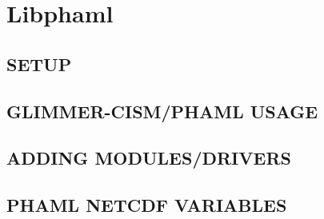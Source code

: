 

\newenvironment{framecode}[1]%
{
 \vspace{.5cm} 
 \begin{center}
 \begin{Sbox}
 \begin{minipage}{#1}

}
{
 \end{minipage}
 \end{Sbox}
 \fbox{\TheSbox}
 \end{center}
 }



\newcommand{\appdir}{}

\newenvironment{dispcode}[3]%
{
\section{#1}\label{#3}
\begin{footnotesize}

\end{footnotesize}
}
{

}



\chapter{Libphaml}

\section{SETUP}\label{ch:setup}


\section{GLIMMER-CISM/PHAML USAGE}\label{ch:usage}


\section{ADDING MODULES/DRIVERS} \label{ch:addingmods}


\section{PHAML NETCDF VARIABLES} \label{ch:phamlvars}

